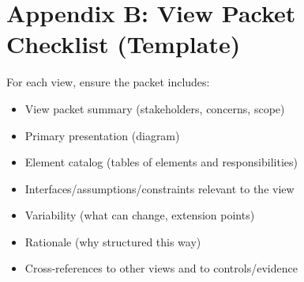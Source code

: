 \documentclass[11pt]{report}
\begin{document}
\chapter{Appendix B: View Packet Checklist (Template)}
For each view, ensure the packet includes:
\begin{itemize}
  \item View packet summary (stakeholders, concerns, scope)
  \item Primary presentation (diagram)
  \item Element catalog (tables of elements and responsibilities)
  \item Interfaces/assumptions/constraints relevant to the view
  \item Variability (what can change, extension points)
  \item Rationale (why structured this way)
  \item Cross-references to other views and to controls/evidence
\end{itemize}
\end{document}
